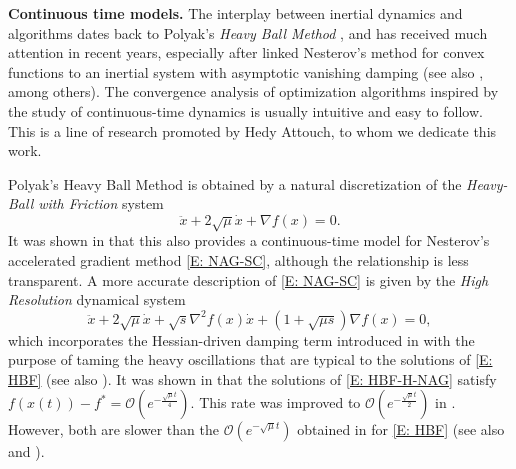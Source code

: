 \documentclass[pdflatex,sn-mathphys-num]{sn-jnl}
\theoremstyle{thmstyleone}
\theoremstyle{thmstyletwo}
\theoremstyle{thmstylethree}
\begin{document}
{\bf Continuous time models.} The interplay between inertial dynamics and algorithms dates back to Polyak's {\it Heavy Ball Method} \cite{Polyak_1964}, and has received much attention in recent years, especially after \cite{Su_2016} linked Nesterov's method for convex functions \cite{Nesterov_1983} to an inertial system with asymptotic vanishing damping (see also \cite{Jordan_2016,Attouch_2016_Hessian,May_2017,Attouch_2018,Aujol_2019,Siegel_2019,Luo_2022,Shi_2022,Shi_2024}, among others). The convergence analysis of optimization algorithms inspired by the study of continuous-time dynamics is usually intuitive and easy to follow. This is a line of research promoted by Hedy Attouch, to whom we dedicate this work.

Polyak's Heavy Ball Method is obtained by a natural discretization of the {\it Heavy-Ball with Friction} system \cite{Polyak_1964,Attouch_2000}
\begin{equation}\label{E: HBF}
\ddot{x} + 2\sqrt{\mu}\dot{x} + \nabla f(x) = 0.
\end{equation}
It was shown in \cite{Jordan_2021} that this also provides a continuous-time model for
Nesterov's accelerated gradient method \eqref{E: NAG-SC}, although the relationship is less transparent. A more accurate description of \eqref{E: NAG-SC} is given by the {\it High Resolution} dynamical system \cite{Shi_2022}
\begin{equation}\label{E: HBF-H-NAG}
\ddot{x} + 2\sqrt{\mu}\dot{x} + \sqrt{s}\nabla^2 f(x)\dot{x} + \left( 1 + \sqrt{\mu s} \right)\nabla f(x) = 0,
\end{equation}
which incorporates the Hessian-driven damping term
introduced in \cite{Alvarez_2002} with the purpose of taming the heavy oscillations that are typical to the solutions of \eqref{E: HBF} (see also \cite{Attouch_2016_Hessian}). It was shown in \cite{Shi_2022} that the solutions of \eqref{E: HBF-H-NAG} satisfy $f(x(t))-f^*=\mathcal O\left( e^{-\frac{\sqrt{\mu}t}{4}} \right)$. This rate was improved to $\mathcal{O}\left( e^{-\frac{\sqrt{\mu}t}{2}} \right)$ in \cite{Attouch_2022}. However, both are slower than the $\mathcal O\left(e^{-\sqrt{\mu}t}\right)$ obtained in \cite{Siegel_2019} for \eqref{E: HBF}  (see also \cite{Jordan_2021} and \cite{Attouch_2022}). \\
\end{document}
